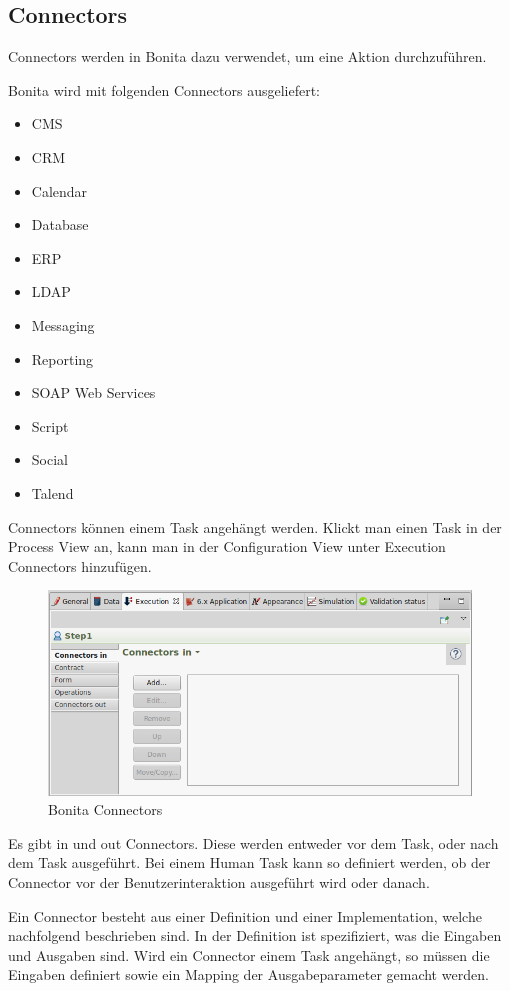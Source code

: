 \subsection{Connectors}
\label{sec:analyse:bonita:connectors}
Connectors werden in Bonita dazu verwendet, um eine Aktion durchzuführen. 

Bonita wird mit folgenden Connectors ausgeliefert:
\begin{itemize}
\item CMS
\item CRM
\item Calendar
\item Database
\item ERP
\item LDAP
\item Messaging
\item Reporting
\item SOAP Web Services
\item Script
\item Social
\item Talend
\end{itemize}

Connectors können einem Task angehängt werden. Klickt man einen Task in der Process View an, kann man in der Configuration View unter Execution Connectors hinzufügen.
\begin{figure}[H]
	\centering
	\includegraphics[width=1\textwidth]{images/bonita-connectors.png}
	\caption{Bonita Connectors}
	\label{fig:analyse:bonita:connectors}
\end{figure}
Es gibt in und out Connectors. Diese werden entweder vor dem Task, oder nach dem Task ausgeführt. Bei einem Human Task kann so definiert werden, ob der Connector vor der Benutzerinteraktion ausgeführt wird oder danach.

Ein Connector besteht aus einer Definition und einer Implementation, welche nachfolgend beschrieben sind. In der Definition ist spezifiziert, was die Eingaben und Ausgaben sind. Wird ein Connector einem Task angehängt, so müssen die Eingaben definiert sowie ein Mapping der Ausgabeparameter gemacht werden.

